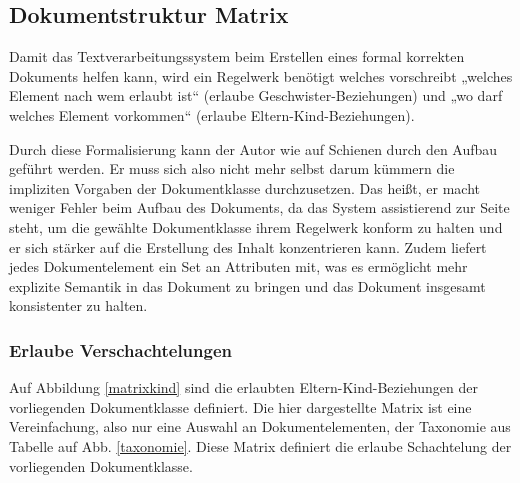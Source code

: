 \subsection{Dokumentstruktur Matrix}\label{}
 
Damit das Textverarbeitungssystem beim Erstellen eines formal korrekten Dokuments helfen kann, wird ein Regelwerk benötigt welches vorschreibt „welches Element nach wem erlaubt ist“ (erlaube Geschwister-Beziehungen) und „wo darf welches Element vorkommen“ (erlaube Eltern-Kind-Beziehungen).

 
Durch diese Formalisierung kann der Autor wie auf Schienen durch den Aufbau geführt werden. Er muss sich also nicht mehr selbst darum kümmern die impliziten Vorgaben der Dokumentklasse durchzusetzen. Das heißt, er macht weniger Fehler beim Aufbau des Dokuments, da das System assistierend zur Seite steht, um die gewählte Dokumentklasse ihrem Regelwerk konform zu halten und er sich stärker auf die Erstellung des Inhalt konzentrieren kann. Zudem liefert jedes Dokumentelement ein Set an Attributen mit, was es ermöglicht mehr explizite Semantik in das Dokument zu bringen und das Dokument insgesamt konsistenter zu halten.

 
\subsubsection{Erlaube Verschachtelungen}\label{}

 
Auf Abbildung \ref{matrixkind} sind die erlaubten Eltern-Kind-Beziehungen der vorliegenden Dokumentklasse definiert. Die hier dargestellte Matrix ist eine Vereinfachung, also nur eine Auswahl an Dokumentelementen, der Taxonomie aus Tabelle auf Abb. \ref{taxonomie}. Diese Matrix definiert die erlaube Schachtelung der vorliegenden Dokumentklasse.


